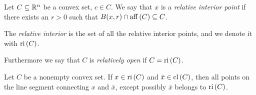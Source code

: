 \begin{definition}
    
    Let $C \subseteq {\mathbb{R}^n}$ be a convex set, $c \in C$. We say that $x$ is a \emph{relative interior point} if there exists an $r > 0$ such that $B(x,r) \cap \mathrm{aff}\left(C\right) \subseteq C$. 

    The \emph{relative interior} is the set of all the relative interior points, and we denote it with $\mathrm{ri}\left(C\right)$.

    Furthermore we say that $C$ is \emph{relatively open} if $C = \mathrm{ri}\left(C\right)$.

\end{definition}

\begin{proposition}

    Let $C$ be a nonempty convex set. If $x \in \mathrm{ri}\left(C\right)$ and $\bar{x} \in \mathrm{cl}\left(C\right)$, then all points on the line segment connecting $x$ and $\bar{x}$, except possibly $\bar{x}$ belongs to $\mathrm{ri}\left(C\right)$.
    
\end{proposition}

